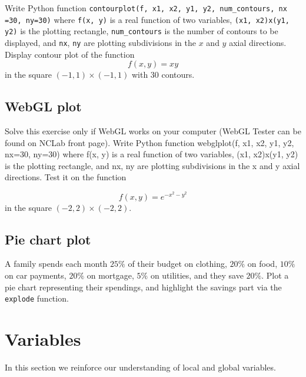 Write Python function {\tt contourplot(f, x1, x2, y1, y2, num\_contours, 
nx =30, ny=30)} where {\tt f(x, y)} is a real function 
of two variables, {\tt (x1, x2)x(y1, y2)} is the plotting rectangle, {\tt num\_contours}
is the number of contours to be displayed, and {\tt nx}, {\tt ny} are plotting 
subdivisions in the $x$ and $y$ axial directions. Display contour plot of the function 
$$
f(x, y) = xy 
$$
in the square $(-1, 1)\times (-1, 1)$ with 30 contours.


\subsection{WebGL plot}

Solve this exercise only if WebGL works on your 
computer (WebGL Tester can be found on NCLab 
front page). Write Python function webglplot(f, x1, x2, y1, y2, nx=30, ny=30) where 
f(x, y) is a real function of two variables, (x1, x2)x(y1, y2) is the plotting 
rectangle, and nx, ny are plotting subdivisions in the x and y axial directions. 
Test it on the function

$$
f(x, y) = e^{-x^2 - y^2}
$$
in the square $(-2, 2)\times (-2, 2)$.


\subsection{Pie chart plot}

A family spends each month $25 \%$ of their budget on clothing,
$20\%$ on food, $10\%$ on car payments, $20 \%$ on mortgage,
$5 \%$ on utilities, and they save $20 \%$. Plot a pie chart 
representing their spendings, and highlight the savings part via 
the {\tt explode} function.


\section{Variables}

In this section we reinforce our understanding of local and global variables.



